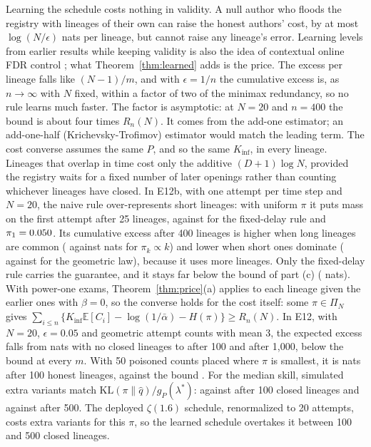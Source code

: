 Learning the schedule costs nothing in validity. A null author who floods the registry with lineages of their own can raise the honest authors' cost, by at most $\log(N/\epsilon)$ nats per lineage, but cannot raise any lineage's error. Learning levels from earlier results while keeping validity is also the idea of contextual online FDR control \citep{chen2020contextual}; what Theorem~\ref{thm:learned} adds is the price. The excess per lineage falls like $(N-1)/m$, and with $\epsilon=1/n$ the cumulative excess is, as $n\to\infty$ with $N$ fixed, within a factor of two of the minimax redundancy, so no rule learns much faster. The factor is asymptotic: at $N=20$ and $n=400$ the bound is about four times $R_n(N)$. It comes from the add-one estimator; an add-one-half (Krichevsky-Trofimov) estimator would match the leading term. The cost converse assumes the same $P$, and so the same $K_{\inf}$, in every lineage. Lineages that overlap in time cost only the additive $(D+1)\log N$, provided the registry waits for a fixed number of later openings rather than counting whichever lineages have closed. In E12b, with one attempt per time step and $N=20$, the naive rule over-represents short lineages: with uniform $\pi$ it puts mass \NObUnifQoneNaive{} on the first attempt after 25 lineages, against \NObUnifQoneDelay{} for the fixed-delay rule and $\pi_1=0.050$. Its cumulative excess after 400 lineages is higher when long lineages are common (\NObIncNaive{} against \NObIncDelay{} nats for $\pi_k\propto k$) and lower when short ones dominate (\NObGeoNaive{} against \NObGeoDelay{} for the geometric law), because it uses more lineages. Only the fixed-delay rule carries the guarantee, and it stays far below the bound of part (c) (\NObBound{} nats). With power-one exams, Theorem~\ref{thm:price}(a) applies to each lineage given the earlier ones with $\beta=0$, so the converse holds for the cost itself: some $\pi\in\Pi_N$ gives $\sum_{i\le n}\{K_{\inf}\mathbb E[C_i]-\log(1/\bar\alpha)-H(\pi)\}\ge R_n(N)$. In E12, with $N=20$, $\epsilon=0.05$ and geometric attempt counts with mean 3, the expected excess falls from \NScKLZero{} nats with no closed lineages to \NScKLHundred{} after 100 and \NScKLThousand{} after 1{,}000, below the bound at every $m$. With 50 poisoned counts placed where $\pi$ is smallest, it is \NScKLPoisonHundred{} nats after 100 honest lineages, against the bound \NScBoundPoisonHundred. For the median skill, simulated extra variants match $\mathrm{KL}(\pi\|\hat q)/g_P(\lambda^*)$: \NScVarHundredSim{} against \NScVarHundredTh{} after 100 closed lineages and \NScVarFiveHundredSim{} against \NScVarFiveHundredTh{} after 500. The deployed $\zeta(1.6)$ schedule, renormalized to 20 attempts, costs \NScVarZetaSim{} extra variants for this $\pi$, so the learned schedule overtakes it between 100 and 500 closed lineages.

